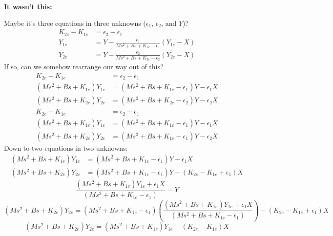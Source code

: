 \documentclass[10pt]{article}
\begin{document}
\newpage
\textbf{It wasn't this:}

Maybe it's three equations in three unknowns ($\epsilon_1$, $\epsilon_2$, and $Y$)?
\begin{subequations}
\begin{align}
K_{2e}-K_{1e} &= \epsilon_2 - \epsilon_1 \\
Y_{1e}&=Y-\frac{\epsilon_1}{Ms^2+Bs+K_{1e}-\epsilon_1}(Y_{1e}-X) \\
Y_{2e}&=Y-\frac{\epsilon_2}{Ms^2+Bs+K_{2e}-\epsilon_2}(Y_{2e}-X)
\end{align}
\end{subequations}
If so, can we somehow rearrange our way out of this?
\begin{subequations}
\begin{align}
K_{2e}-K_{1e} &= \epsilon_2 - \epsilon_1 \\
(Ms^2+Bs+K_{1e})Y_{1e}&=(Ms^2+Bs+K_{1e}-\epsilon_1)Y-\epsilon_1 X \\
(Ms^2+Bs+K_{2e})Y_{2e}&=(Ms^2+Bs+K_{2e}-\epsilon_2)Y-\epsilon_2 X
\end{align}
\end{subequations}
\begin{subequations}
\begin{align}
K_{2e}-K_{1e} &= \epsilon_2 - \epsilon_1 \\
(Ms^2+Bs+K_{1e})Y_{1e}&=(Ms^2+Bs+K_{1e}-\epsilon_1)Y-\epsilon_1 X \\
(Ms^2+Bs+K_{2e})Y_{2e}&=(Ms^2+Bs+K_{1e}-\epsilon_1)Y-\epsilon_2 X
\end{align}
\end{subequations}
Down to two equations in two unknowns:
\begin{subequations}
\begin{align}
(Ms^2+Bs+K_{1e})Y_{1e}&=(Ms^2+Bs+K_{1e}-\epsilon_1)Y-\epsilon_1 X \\
(Ms^2+Bs+K_{2e})Y_{2e}&=(Ms^2+Bs+K_{1e}-\epsilon_1)Y-(K_{2e}-K_{1e}+\epsilon_1) X
\end{align}
\end{subequations}
\begin{equation}
\frac{(Ms^2+Bs+K_{1e})Y_{1e}+\epsilon_1 X}{(Ms^2+Bs+K_{1e}-\epsilon_1)}=Y
\end{equation}
\begin{equation}
(Ms^2+Bs+K_{2e})Y_{2e}=(Ms^2+Bs+K_{1e}-\epsilon_1)(\frac{(Ms^2+Bs+K_{1e})Y_{1e}+\epsilon_1 X}{(Ms^2+Bs+K_{1e}-\epsilon_1)})-(K_{2e}-K_{1e}+\epsilon_1) X
\end{equation}
\begin{equation}
(Ms^2+Bs+K_{2e})Y_{2e}=(Ms^2+Bs+K_{1e})Y_{1e}-(K_{2e}-K_{1e}) X
\end{equation}
\end{document}
